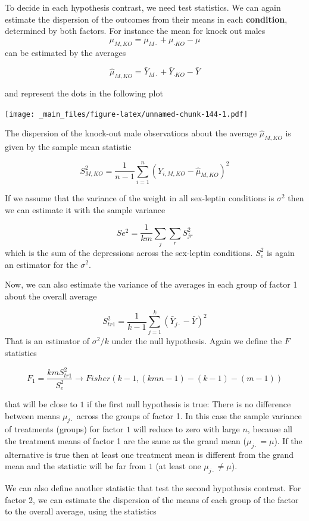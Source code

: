 \documentclass[
]{book}
\begin{document}
To decide in each hypothesis contrast, we need test statistics. We can again estimate the dispersion of the outcomes from their means in each \textbf{condition}, determined by both factors. For instance the mean for knock out males \[\mu_{M,KO}=\mu_{M \cdot} + \mu_{\cdot KO} - \mu\] can be estimated by the averages

\[\hat{\mu}_{M,KO}= \bar{Y}_{M \cdot}+\bar{Y}_{\cdot KO} - \bar{Y}\]

and represent the dots in the following plot

\texttt{[image: \_main\_files/figure-latex/unnamed-chunk-144-1.pdf]}

The dispersion of the knock-out male observations about the average \(\hat{\mu}_{M,KO}\) is given by the sample mean statistic

\[S^2_{M,KO}=\frac{1}{n-1}\sum_{i=1}^n (Y_{i,M,KO}-\hat{\mu}_{M,KO})^2\]

If we assume that the variance of the weight in all sex-leptin conditions is \(\sigma^2\) then we can estimate it with the sample variance

\[Se^2= \frac{1}{km}\sum_j \sum_r S^2_{jr}\]
which is the sum of the depressions across the sex-leptin conditions. \(S_e^2\) is again an estimator for the \(\sigma^2\).

Now, we can also estimate the variance of the averages in each group of factor 1 about the overall average

\[S^2_{tr1}=\frac{1}{k-1} \sum_{j=1}^k(\bar{Y}_{j\cdot}-\bar{Y})^2\]
That is an estimator of \(\sigma^2/k\) under the null hypothesis. Again we define the \(F\) statistics

\[F_1=\frac{kmS_{tr1}^2}{S_{e}^2} \rightarrow Fisher(k-1,(kmn-1)-(k-1)-(m-1))\]

that will be close to \(1\) if the first null hypothesis is true: There is no difference between means \(\mu_{j\cdot}\) across the groups of factor 1. In this case the sample variance of treatments (groups) for factor \(1\) will reduce to zero with large \(n\), because all the treatment means of factor 1 are the same as the grand mean (\(\mu_{j\cdot}=\mu\)). If the alternative is true then at least one treatment mean is different from the grand mean and the statistic will be far from \(1\) (at least one \(\mu_{j\cdot}\neq\mu\)).

We can also define another statistic that test the second hypothesis contrast. For factor 2, we can estimate the dispersion of the means of each group of the factor to the overall average, using the statistics
\end{document}
